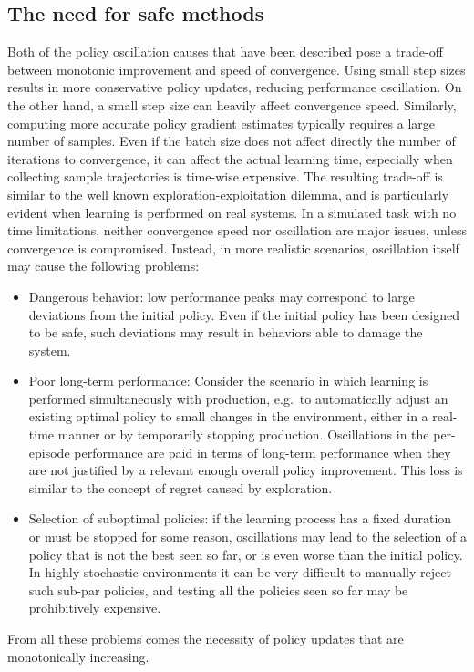\subsection{The need for safe methods}
Both of the policy oscillation causes that have been described pose a trade-off between monotonic improvement and speed of convergence. Using small step sizes results in more conservative policy updates, reducing performance oscillation. On the other hand, a small step size can heavily affect convergence speed. Similarly, computing more accurate policy gradient estimates typically requires a large number of samples. Even if the batch size does not affect directly the number of iterations to convergence, it can affect the actual learning time, especially when collecting sample trajectories is time-wise expensive. The resulting trade-off is similar to the well known exploration-exploitation dilemma, and is particularly evident when learning is performed on real systems. In a simulated task with no time limitations, neither convergence speed nor oscillation are major issues, unless convergence is compromised. Instead, in more realistic scenarios, oscillation itself may cause the following problems:
\begin{itemize}
\item Dangerous behavior: low performance peaks may correspond to large deviations from the initial policy. Even if the initial policy has been designed to be safe, such deviations may result in behaviors able to damage the system.
\item Poor long-term performance: Consider the scenario in which learning is performed simultaneously with production, e.g.\ to automatically adjust an existing optimal policy to small changes in the environment, either in a real-time manner or by temporarily stopping production. Oscillations in the per-episode performance are paid in terms of long-term performance when they are not justified by a relevant enough overall policy improvement. This loss is similar to the concept of regret caused by exploration.
\item Selection of suboptimal policies: if the learning process has a fixed duration or must be stopped for some reason, oscillations may lead to the selection of a policy that is not the best seen so far, or is even worse than the initial policy. In highly stochastic environments it can be very difficult to manually reject such sub-par policies, and testing all the policies seen so far may be prohibitively expensive.
\end{itemize} 
From all these problems comes the necessity of policy updates that are monotonically increasing.

